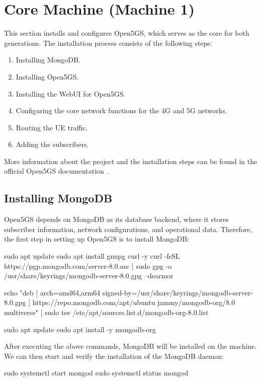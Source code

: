 
\newpage
\section{Core Machine (Machine 1)}
\label{sec:app-core}

This section installs and configures Open5GS, which serves as the core for both generations. The installation process consists of the following steps:

\begin{enumerate}
    \item Installing MongoDB.
    \item Installing Open5GS.
    \item Installing the WebUI for Open5GS.
    \item Configuring the core network functions for the 4G and 5G networks.
    \item Routing the \gls{UE} traffic.
    \item Adding the subscribers.
\end{enumerate}
More information about the project and the installation steps can be found in the official Open5GS documentation~\cite{open5gs_docs}.

\subsection{Installing MongoDB}
\label{sec:Installing_MongoDB}
Open5GS depends on MongoDB as its database backend, where it stores subscriber information, network configurations, and operational data. Therefore, the first step in setting up Open5GS is to install MongoDB:
\begin{code}
sudo apt update
sudo apt install gnupg curl -y
curl -fsSL https://pgp.mongodb.com/server-8.0.asc | sudo gpg -o /usr/share/keyrings/mongodb-server-8.0.gpg --dearmor

echo "deb [ arch=amd64,arm64 signed-by=/usr/share/keyrings/mongodb-server-8.0.gpg ] https://repo.mongodb.com/apt/ubuntu jammy/mongodb-org/8.0 multiverse" | sudo tee /etc/apt/sources.list.d/mongodb-org-8.0.list

sudo apt update
sudo apt install -y mongodb-org
\end{code}
After executing the above commands, MongoDB will be installed on the machine. We can then start and verify the installation of the MongoDB daemon:
\begin{code}
sudo systemctl start mongod
sudo systemctl status mongod
\end{code}


